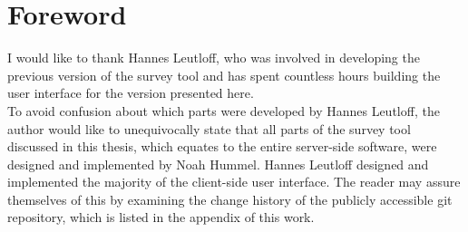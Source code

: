 \documentclass[a4paper,11pt]{article}
\begin{document}
    
    \maketitle

    \pagebreak

    

    \pagebreak
    
    \tableofcontents

    \pagebreak
    
    \section{Foreword}
        I would like to thank Hannes Leutloff, who was involved in developing
        the previous version of the survey tool and has spent countless hours
        building the user interface for the version presented here. \\

        To avoid confusion about which parts were developed by Hannes Leutloff,
        the author would like to unequivocally state that all parts of the
        survey tool discussed in this thesis, which equates to the entire
        server-side software, were designed and implemented by Noah Hummel.
        Hannes Leutloff designed and implemented the majority of the client-side
        user interface. The reader may assure themselves of this by
        examining the change history of the publicly accessible git repository,
        which is listed in the appendix of this work.

    
    
    
    
    
    
    

    \pagebreak
    
    \listoffigures
    \listoftables
    
    
    
    
\end{document}
